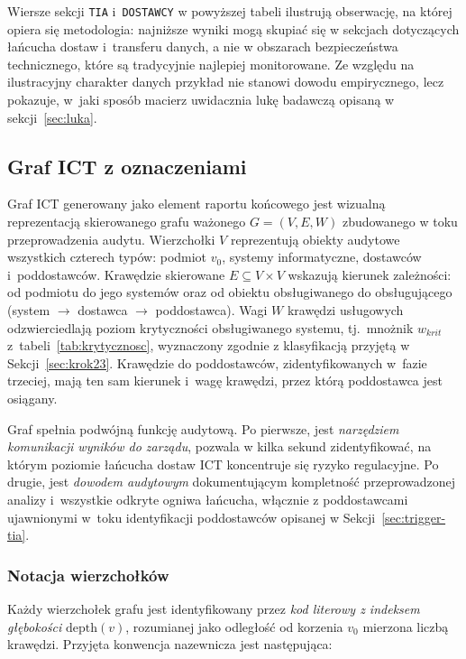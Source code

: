 \noindent Wiersze sekcji \texttt{TIA} i~\texttt{DOSTAWCY}
w powyższej tabeli ilustrują obserwację, na której opiera się
metodologia: najniższe wyniki mogą skupiać się w sekcjach dotyczących
łańcucha dostaw i~transferu danych, a nie
w obszarach bezpieczeństwa technicznego, które
są tradycyjnie najlepiej monitorowane. Ze względu na ilustracyjny
charakter danych przykład nie stanowi dowodu empirycznego, lecz pokazuje,
w~jaki sposób macierz uwidacznia lukę badawczą opisaną w sekcji~\ref{sec:luka}.

\subsection{Graf ICT z oznaczeniami}
\label{sec:graf-ict}


Graf ICT generowany jako element raportu końcowego jest wizualną reprezentacją skierowanego grafu ważonego $G = (V, E, W)$ zbudowanego w toku przeprowadzenia audytu. Wierzchołki $V$ reprezentują obiekty audytowe wszystkich czterech typów: podmiot $v_0$, systemy informatyczne, dostawców i~poddostawców. Krawędzie skierowane $E \subseteq V \times V$ wskazują kierunek zależności: od podmiotu do jego systemów oraz od obiektu obsługiwanego do obsługującego (system $\to$ dostawca $\to$ poddostawca). Wagi $W$ krawędzi usługowych odzwierciedlają poziom krytyczności obsługiwanego systemu, tj.\ mnożnik $w_{krit}$ z~tabeli~\ref{tab:krytycznosc}, wyznaczony zgodnie z klasyfikacją przyjętą w Sekcji~\ref{sec:krok23}. Krawędzie do poddostawców, zidentyfikowanych w~fazie trzeciej, mają ten sam kierunek i~wagę krawędzi, przez którą poddostawca jest osiągany.

Graf spełnia podwójną funkcję audytową. Po pierwsze, jest \emph{narzędziem komunikacji wyników do zarządu}, pozwala w kilka sekund zidentyfikować, na którym poziomie łańcucha dostaw ICT koncentruje się ryzyko regulacyjne. Po drugie, jest \emph{dowodem audytowym} dokumentującym kompletność przeprowadzonej analizy i~wszystkie odkryte ogniwa łańcucha, włącznie z poddostawcami ujawnionymi w~toku identyfikacji poddostawców opisanej w Sekcji~\ref{sec:trigger-tia}.

\subsubsection{Notacja wierzchołków}
\label{sec:notacja-wierzcholkow}

Każdy wierzchołek grafu jest identyfikowany przez \emph{kod literowy z indeksem głębokości} $\mathrm{depth}(v)$, rozumianej jako odległość od korzenia $v_0$ mierzona liczbą krawędzi. Przyjęta konwencja nazewnicza jest następująca:

